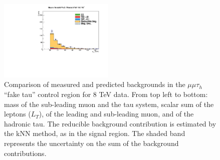 \begin{figure}
\begin{center}
  \includegraphics[width=0.49\textwidth]{4_Analisys/pics/8TeV/plots/mmt/f3/Full/final-f3-tPt-Full.pdf}
  \caption{Comparison of measured and predicted backgrounds in the $\mu\mu\tau_h$ ``fake tau'' control region for 8 TeV data.
  From top left to bottom: mass of the sub-leading muon and the tau system, scalar sum of the leptons \pT ($L_T$), \pT of the leading and sub-leading muon, and \pT of the hadronic tau.
  The reducible background contribution is estimated by the kNN method, as in the signal region.
  The shaded band represents the uncertainty on the sum of the background contributions.
  }
  \label{fig:LLT_mmt_f3_control_8TeV}
\end{center}
\end{figure}

